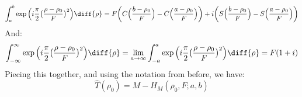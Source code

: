 \documentclass[crop=false,class=article,oneside]{standalone}
\begin{document}
            \begin{equation*}
                \int_{a}^{b}
                \exp\Big(i\frac{\pi}{2}
                    \big(\frac{\rho-\rho_0}{F}\big)^{2}\Big)
                \diff{\rho}
                =F\bigg(C\Big(\frac{b-\rho_0}{F}\Big)-
                C\Big(\frac{a-\rho_0}{F}\Big)\bigg)+
                i\bigg(S\Big(\frac{b-\rho_0}{F}\Big)-
                S\Big(\frac{a-\rho_0}{F}\Big)\bigg)
            \end{equation*}
            And:
            \begin{equation*}
                \int_{-\infty}^{\infty}
                \exp\Big(i\frac{\pi}{2}
                    \big(\frac{\rho-\rho_0}{F}\big)^{2}\Big)
                \diff{\rho}
                =\underset{a\rightarrow \infty}{\lim}
                \int_{-a}^{a}
                \exp\Big(i\frac{\pi}{2}
                    \big(\frac{\rho-\rho_0}{F}\big)^{2}\Big)
                \diff{\rho}
                =F(1+i)
            \end{equation*}
            Piecing this together, and using the notation from before,
            we have:
            \begin{equation*}
            \hat{T}(\rho_0)=M-H_{M}(\rho_0,F;a,b)
            \end{equation*}
\end{document}
